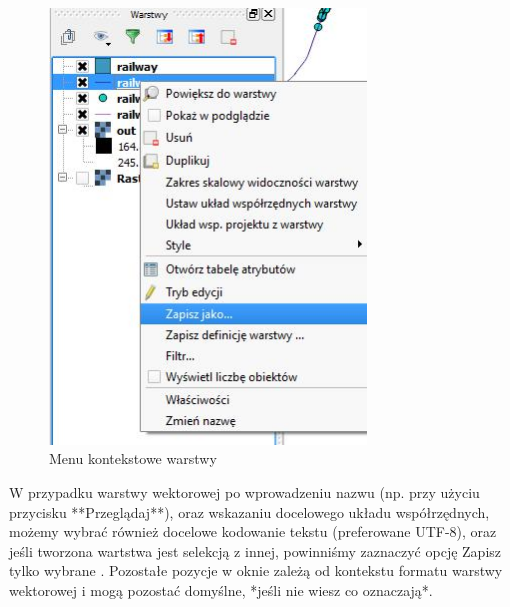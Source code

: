 \documentclass[12pt,a4paper]{book}
\begin{document}
\begin{center}
\begin{figure}
\includegraphics[width=8.435cm,height=11.557cm]{002-menu-kontekstowe.jpg}
\caption{Menu kontekstowe warstwy}
\end{figure}
\end{center}
W przypadku warstwy wektorowej po wprowadzeniu nazwu (np. przy użyciu przycisku **Przeglądaj**), oraz wskazaniu
docelowego układu współrzędnych, możemy wybrać również docelowe kodowanie tekstu (preferowane UTF-8), oraz jeśli tworzona wartstwa jest selekcją z innej, powinniśmy zaznaczyć opcję  Zapisz tylko wybrane . Pozostałe pozycje w oknie zależą od kontekstu formatu warstwy wektorowej i mogą pozostać domyślne, *{\textquotedbl}jeśli nie wiesz co oznaczają{\textquotedbl}*.
\end{document}
